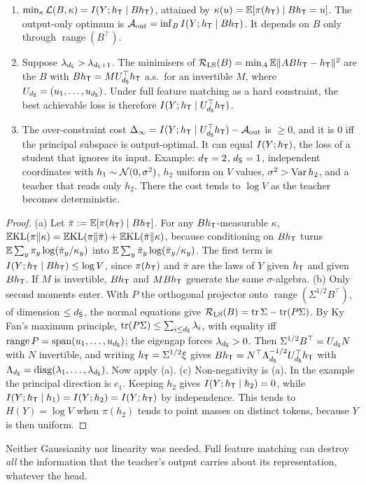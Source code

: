 \begin{theorem}\label{thm:nl-overconstraint}
\Mo\Ck
\begin{enumerate}[label=(\alph*),nosep]
\item $\min_\kappa\mathcal{L}(B,\kappa)=I(Y;h_{\mathsf{T}}\mid Bh_{\mathsf{T}})$, attained by $\kappa(u)=\mathbb{E}[\pi(h_{\mathsf{T}})\mid Bh_{\mathsf{T}}=u]$. The output-only optimum
is $\mathcal{A}_{\mathrm{out}}=\inf_BI(Y;h_{\mathsf{T}}\mid Bh_{\mathsf{T}})$. It depends on $B$ only through $\operatorname{range}(B^\top)$.
\item Suppose $\lambda_{d_{\mathsf{S}}}>\lambda_{d_{\mathsf{S}}+1}$. The minimisers of $\mathcal{R}_{\mathrm{LS}}(B)=\min_A\mathbb{E}\|ABh_{\mathsf{T}}-h_{\mathsf{T}}\|^2$ are the $B$ with
$Bh_{\mathsf{T}}=MU_{d_{\mathsf{S}}}^\top h_{\mathsf{T}}$ a.s.\ for an invertible $M$, where $U_{d_{\mathsf{S}}}=(u_1,\dots,u_{d_{\mathsf{S}}})$. Under full feature matching as a
hard constraint, the best achievable loss is therefore $I(Y;h_{\mathsf{T}}\mid U_{d_{\mathsf{S}}}^\top h_{\mathsf{T}})$.
\item The over-constraint cost $\Delta_\infty=I(Y;h_{\mathsf{T}}\mid U_{d_{\mathsf{S}}}^\top h_{\mathsf{T}})-\mathcal{A}_{\mathrm{out}}$ is $\ge0$, and it is $0$ iff the
principal subspace is output-optimal. It can equal $I(Y;h_{\mathsf{T}})$, the loss of a student that ignores its input.
Example: $d_{\mathsf{T}}=2$, $d_{\mathsf{S}}=1$, independent coordinates with $h_1\sim\mathcal{N}(0,\sigma^2)$, $h_2$ uniform on $V$ values,
$\sigma^2>\operatorname{Var} h_2$, and a teacher that reads only $h_2$. There the cost tends to $\log V$ as the teacher becomes
deterministic.
\end{enumerate}
\end{theorem}
\begin{proof}
(a) Let $\bar\pi:=\mathbb{E}[\pi(h_{\mathsf{T}})\mid Bh_{\mathsf{T}}]$. For any $Bh_{\mathsf{T}}$-measurable $\kappa$,
$\mathbb{E}\mathrm{KL}(\pi\|\kappa)=\mathbb{E}\mathrm{KL}(\pi\|\bar\pi)+\mathbb{E}\mathrm{KL}(\bar\pi\|\kappa)$, because conditioning on $Bh_{\mathsf{T}}$ turns
$\mathbb{E}\sum_y\pi_y\log(\bar\pi_y/\kappa_y)$ into $\mathbb{E}\sum_y\bar\pi_y\log(\bar\pi_y/\kappa_y)$. The first term is $I(Y;h_{\mathsf{T}}\mid Bh_{\mathsf{T}})\le\log V$,
since $\pi(h_{\mathsf{T}})$ and $\bar\pi$ are the laws of $Y$ given $h_{\mathsf{T}}$ and given $Bh_{\mathsf{T}}$. If $M$ is invertible, $Bh_{\mathsf{T}}$ and $MBh_{\mathsf{T}}$
generate the same $\sigma$-algebra.
(b) Only second moments enter. With $P$ the orthogonal projector onto $\operatorname{range}(\Sigma^{1/2}B^\top)$, of dimension
$\le d_{\mathsf{S}}$, the normal equations give $\mathcal{R}_{\mathrm{LS}}(B)=\operatorname{tr}\Sigma-\operatorname{tr}(P\Sigma)$. By Ky Fan's maximum principle,
$\operatorname{tr}(P\Sigma)\le\sum_{i\le d_{\mathsf{S}}}\lambda_i$, with equality iff $\operatorname{range}P=\operatorname{span}(u_1,\dots,u_{d_{\mathsf{S}}})$; the eigengap forces
$\lambda_{d_{\mathsf{S}}}>0$. Then $\Sigma^{1/2}B^\top=U_{d_{\mathsf{S}}}N$ with $N$ invertible, and writing $h_{\mathsf{T}}=\Sigma^{1/2}\xi$ gives
$Bh_{\mathsf{T}}=N^\top\Lambda_{d_{\mathsf{S}}}^{-1/2}U_{d_{\mathsf{S}}}^\top h_{\mathsf{T}}$ with $\Lambda_{d_{\mathsf{S}}}=\operatorname{diag}(\lambda_1,\dots,\lambda_{d_{\mathsf{S}}})$. Now apply (a).
(c) Non-negativity is (a). In the example the principal direction is $e_1$. Keeping $h_2$ gives $I(Y;h_{\mathsf{T}}\mid h_2)=0$, while
$I(Y;h_{\mathsf{T}}\mid h_1)=I(Y;h_2)=I(Y;h_{\mathsf{T}})$ by independence. This tends to $H(Y)=\log V$ when $\pi(h_2)$ tends to point masses on
distinct tokens, because $Y$ is then uniform.
\end{proof}
\noindent
Neither Gaussianity nor linearity was needed. Full feature matching can destroy \emph{all} the information that the
teacher's output carries about its representation, whatever the head.

